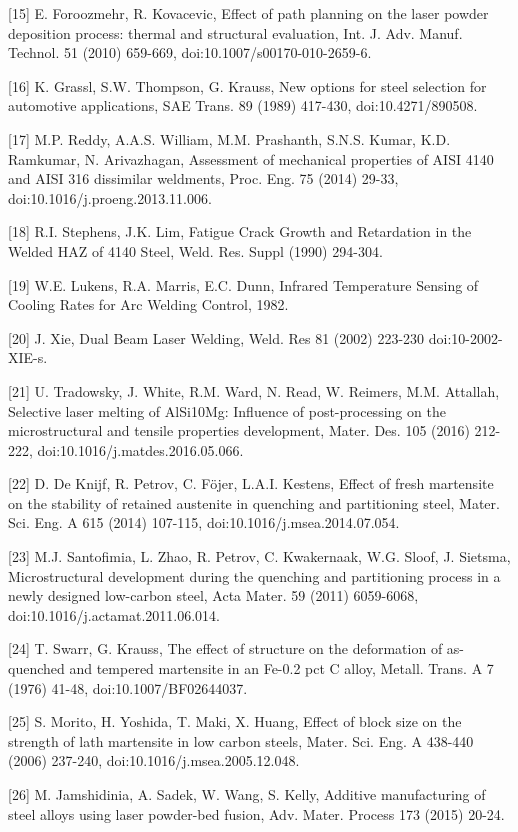 \documentclass[10pt]{article}
\begin{document}
[15] E. Foroozmehr, R. Kovacevic, Effect of path planning on the laser powder deposition process: thermal and structural evaluation, Int. J. Adv. Manuf. Technol. 51 (2010) 659-669, doi:10.1007/s00170-010-2659-6.

[16] K. Grassl, S.W. Thompson, G. Krauss, New options for steel selection for automotive applications, SAE Trans. 89 (1989) 417-430, doi:10.4271/890508.

[17] M.P. Reddy, A.A.S. William, M.M. Prashanth, S.N.S. Kumar, K.D. Ramkumar, N. Arivazhagan, Assessment of mechanical properties of AISI 4140 and AISI 316 dissimilar weldments, Proc. Eng. 75 (2014) 29-33, doi:10.1016/j.proeng.2013.11.006.

[18] R.I. Stephens, J.K. Lim, Fatigue Crack Growth and Retardation in the Welded HAZ of 4140 Steel, Weld. Res. Suppl (1990) 294-304.

[19] W.E. Lukens, R.A. Marris, E.C. Dunn, Infrared Temperature Sensing of Cooling Rates for Arc Welding Control, 1982.

[20] J. Xie, Dual Beam Laser Welding, Weld. Res 81 (2002) 223-230 doi:10-2002-XIE-s.

[21] U. Tradowsky, J. White, R.M. Ward, N. Read, W. Reimers, M.M. Attallah, Selective laser melting of AlSi10Mg: Influence of post-processing on the microstructural and tensile properties development, Mater. Des. 105 (2016) 212-222, doi:10.1016/j.matdes.2016.05.066.

[22] D. De Knijf, R. Petrov, C. Föjer, L.A.I. Kestens, Effect of fresh martensite on the stability of retained austenite in quenching and partitioning steel, Mater. Sci. Eng. A 615 (2014) 107-115, doi:10.1016/j.msea.2014.07.054.

[23] M.J. Santofimia, L. Zhao, R. Petrov, C. Kwakernaak, W.G. Sloof, J. Sietsma, Microstructural development during the quenching and partitioning process in a newly designed low-carbon steel, Acta Mater. 59 (2011) 6059-6068, doi:10.1016/j.actamat.2011.06.014.

[24] T. Swarr, G. Krauss, The effect of structure on the deformation of as-quenched and tempered martensite in an Fe-0.2 pct C alloy, Metall. Trans. A 7 (1976) 41-48, doi:10.1007/BF02644037.

[25] S. Morito, H. Yoshida, T. Maki, X. Huang, Effect of block size on the strength of lath martensite in low carbon steels, Mater. Sci. Eng. A 438-440 (2006) 237-240, doi:10.1016/j.msea.2005.12.048.

[26] M. Jamshidinia, A. Sadek, W. Wang, S. Kelly, Additive manufacturing of steel alloys using laser powder-bed fusion, Adv. Mater. Process 173 (2015) 20-24.
\end{document}
